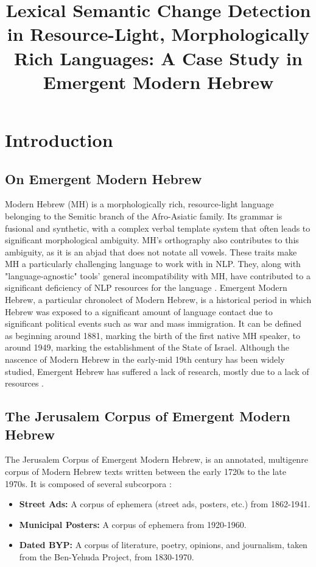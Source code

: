\documentclass[10pt, a4paper]{article}
\title{\vspace*{.5\baselineskip} \textbf{Lexical Semantic Change Detection in Resource-Light, Morphologically Rich Languages: A Case Study in Emergent Modern Hebrew}}
\begin{document}
\maketitleabstract

\section{Introduction}

\subsection{On Emergent Modern Hebrew}
Modern Hebrew (MH) is a morphologically rich, resource-light language belonging to the Semitic branch of the Afro-Asiatic family. Its grammar is fusional and synthetic, with a complex verbal template system that often leads to significant morphological ambiguity. MH's orthography also contributes to this ambiguity, as it is an abjad that does not notate all vowels.
These traits make MH a particularly challenging language to work with in NLP. They, along with "language-agnostic" tools' general incompatibility with MH, have contributed to a significant deficiency of NLP resources for the language \cite{tsarfaty2019whats}.
Emergent Modern Hebrew, a particular chronolect of Modern Hebrew, is a historical period in which Hebrew was exposed to a significant amount of language contact due to significant political events such as war and mass immigration. It can be defined as beginning around 1881, marking the birth of the first native MH speaker, to around 1949, marking the establishment of the State of Israel. Although the nascence of Modern Hebrew in the early-mid 19th century has been widely studied, Emergent Hebrew has suffered a lack of research, mostly due to a lack of resources \cite{Rubinstein2019}.

\subsection{The Jerusalem Corpus of Emergent Modern Hebrew}
The Jerusalem Corpus of Emergent Modern Hebrew, is an annotated, multigenre corpus of Modern Hebrew texts written between the early 1720s to the late 1970s. It is composed of several subcorpora \cite{Rubinstein2019}:
\begin{itemize}
    \item \textbf{Street Ads:} A corpus of ephemera (street ads, posters, etc.) from 1862-1941.
    \item \textbf{Municipal Posters:} A corpus of ephemera from 1920-1960.
    \item \textbf{Dated BYP:} A corpus of literature, poetry, opinions, and journalism, taken from the Ben-Yehuda Project, from 1830-1970.
\end{itemize}
\end{document}
